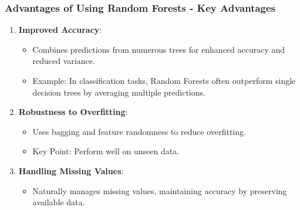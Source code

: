 \documentclass[aspectratio=169]{beamer}
\begin{document}
\begin{frame}[fragile]
    \frametitle{Advantages of Using Random Forests - Key Advantages}
    \begin{enumerate}
        \item \textbf{Improved Accuracy}:
        \begin{itemize}
            \item Combines predictions from numerous trees for enhanced accuracy and reduced variance.
            \item Example: In classification tasks, Random Forests often outperform single decision trees by averaging multiple predictions.
        \end{itemize}

        \item \textbf{Robustness to Overfitting}:
        \begin{itemize}
            \item Uses bagging and feature randomness to reduce overfitting.
            \item Key Point: Perform well on unseen data.
        \end{itemize}

        \item \textbf{Handling Missing Values}:
        \begin{itemize}
            \item Naturally manages missing values, maintaining accuracy by preserving available data.
        \end{itemize}
    \end{enumerate}
\end{frame}
\end{document}
